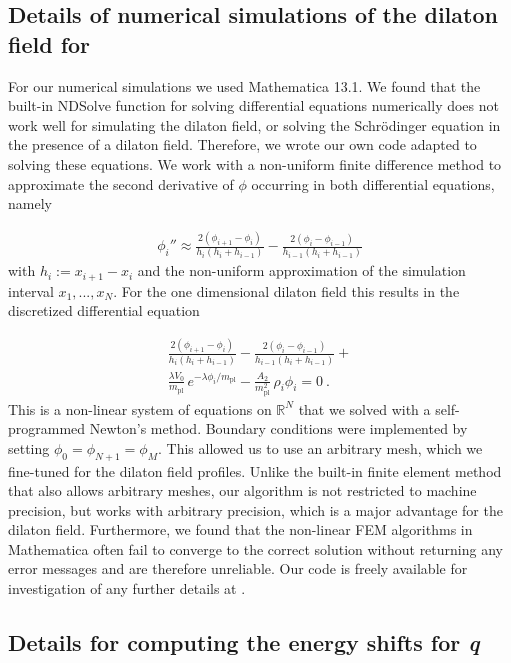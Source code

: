 \documentclass[aps,pra,twocolumn,floatfix,superscriptaddress,nofootinbib,showpacs,a4paper,balancelastpage,twoside]{revtex4-2}
\newcommand{\qbounce}{{\it{q}}{\sc{Bounce}}}				%
\newcommand{\cannex}{{\sc{Cannex}}}				%
\begin{document}
\subsection{Details of numerical simulations of the dilaton field for \cannex{}}\label{AppSM4}

For our numerical simulations we used Mathematica 13.1. We found that the built-in NDSolve function for solving differential equations numerically does not work well for simulating the dilaton field, or solving the Schr\"odinger equation in the presence of a dilaton field. Therefore, we wrote our own code adapted to solving these equations. We work with a non-uniform finite difference method to approximate the second derivative of $\phi$ occurring in both differential equations, namely \cite{tan1990self}

\begin{align}
\phi_{i}'' \approx \frac{2(\phi_{i+1}-\phi_{i})}{h_i(h_i+h_{i-1})}-\frac{2(\phi_{i}-\phi_{i-1})}{h_{i-1}(h_i+h_{i-1})}
\end{align}
 with $h_i := x_{i+1}-x_i$ and the non-uniform approximation of the simulation interval $x_1, ..., x_N$. For the one dimensional dilaton field this results in the discretized differential equation

\begin{align}
\frac{2(\phi_{i+1}-\phi_{i})}{h_i(h_i+h_{i-1})}-\frac{2(\phi_{i}-\phi_{i-1})}{h_{i-1}(h_i+h_{i-1})} + \nonumber\\
\frac{\lambda V_0}{m_{\text{pl}}}\,e^{- \lambda \phi_i/m_{\text{pl}}} - \frac{A_2}{m_{\text{pl}}^2}\,\rho_i \phi_i = 0\>.\label{discretizte}
\end{align}
This is a non-linear system of equations on $\mathbb{R}^N$ that we solved with a self-programmed Newton's method. Boundary conditions were implemented by setting $\phi_0 = \phi_{N+1} = \phi_M$. This allowed us to use an arbitrary mesh, which we fine-tuned for the  dilaton field profiles. Unlike the built-in finite element method that also allows arbitrary meshes, our algorithm is not restricted to machine precision, but works with arbitrary precision, which is a major advantage for the dilaton field. Furthermore, we found that the non-linear FEM algorithms in Mathematica often fail to converge to the correct solution without returning any error messages and are therefore unreliable. Our code is freely available for investigation of any further details at \cite{H.Fischer_DilatonCode}.


\subsection{Details for computing the energy shifts for \qbounce{}}\label{AppSM5}
\end{document}
